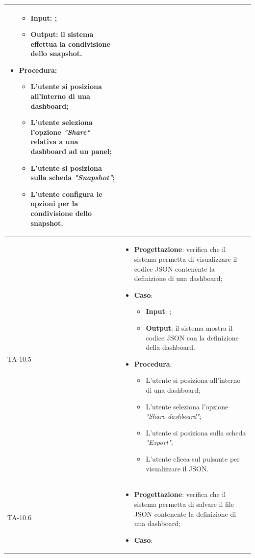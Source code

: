 \begin{longtable}{|C{2.5cm}|C{13cm}|}
\begin{itemize}
	\begin{itemize}
		\item \textbf{Input}: ;
		\item \textbf{Output}: il sistema effettua la condivisione dello snapshot.
	\end{itemize}
	\item \textbf{Procedura}:
	\begin{itemize}
		\item L'utente si posiziona all'interno di una dashboard;
		\item L'utente seleziona l'opzione \emph{"Share"} relativa a una dashboard ad un panel;
		\item L'utente si posiziona sulla scheda \emph{"Snapshot"};
		\item L'utente configura le opzioni per la condivisione dello snapshot.
	\end{itemize} 
\end{itemize}\\
\hline
{TA-10.5} &
\begin{itemize}
	\item \textbf{Progettazione}: verifica che il sistema permetta di visualizzare il codice JSON contenente la definizione
	di una dashboard;
	\item \textbf{Caso}: 
	\begin{itemize}
		\item \textbf{Input}: ;
		\item \textbf{Output}: il sistema mostra il codice JSON con la definizione della dashboard.
	\end{itemize}
	\item \textbf{Procedura}:
	\begin{itemize}
		\item L'utente si posiziona all'interno di una dashboard;
		\item L'utente seleziona l'opzione \emph{"Share dashboard"};
		\item L'utente si posiziona sulla scheda \emph{"Export"};
		\item L'utente clicca sul pulsante per visualizzare il JSON.
	\end{itemize} 
\end{itemize}\\
\hline
{TA-10.6} &
\begin{itemize}
	\item \textbf{Progettazione}: verifica che il sistema permetta di salvare il file JSON contenente la definizione di una
	dashboard;
	\item \textbf{Caso}: 

\end{itemize}
\end{longtable}
